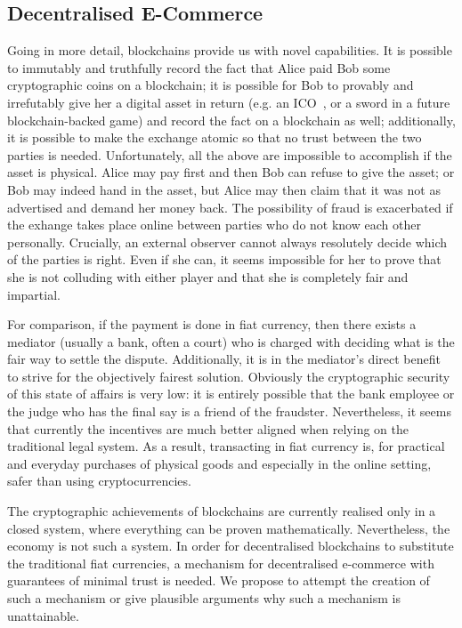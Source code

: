 \subsection{Decentralised E-Commerce}
  Going in more detail, blockchains provide us with novel capabilities. It is possible to
  immutably and truthfully record the fact that Alice paid Bob some cryptographic coins on
  a blockchain; it is possible for Bob to provably and irrefutably give her a digital
  asset in return (e.g. an ICO~\cite{eos}, or a sword in a future blockchain-backed game)
  and record the fact on a blockchain as well; additionally, it is possible to make the
  exchange atomic so that no trust between the two parties is needed. Unfortunately, all
  the above are impossible to accomplish if the asset is physical. Alice may pay first and
  then Bob can refuse to give the asset; or Bob may indeed hand in the asset, but Alice
  may then claim that it was not as advertised and demand her money back. The possibility
  of fraud is exacerbated if the exhange takes place online between parties who do not
  know each other personally. Crucially, an external observer cannot always resolutely
  decide which of the parties is right. Even if she can, it seems impossible for her to
  prove that she is not colluding with either player and that she is completely fair and
  impartial.

  For comparison, if the payment is done in fiat currency, then there exists a mediator
  (usually a bank, often a court) who is charged with deciding what is the fair way to
  settle the dispute. Additionally, it is in the mediator's direct benefit to strive for
  the objectively fairest solution. Obviously the cryptographic security of this state of
  affairs is very low: it is entirely possible that the bank employee or the judge who has
  the final say is a friend of the fraudster. Nevertheless, it seems that currently the
  incentives are much better aligned when relying on the traditional legal system. As a
  result, transacting in fiat currency is, for practical and everyday purchases of
  physical goods and especially in the online setting, safer than using cryptocurrencies.

  The cryptographic achievements of blockchains are currently realised only in a closed
  system, where everything can be proven mathematically. Nevertheless, the economy is not
  such a system. In order for decentralised blockchains to substitute the traditional fiat
  currencies, a mechanism for decentralised e-commerce with guarantees of minimal trust is
  needed. We propose to attempt the creation of such a mechanism or give plausible
  arguments why such a mechanism is unattainable.
